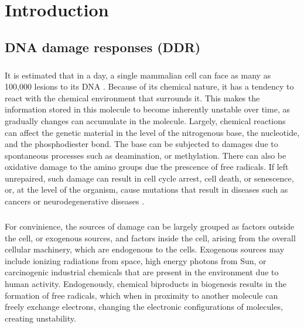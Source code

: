 \chapter{Introduction}
\section{DNA damage responses (DDR)}
\paragraph*{} It is estimated that in a day, a single mammalian cell can face as many as 100,000 lesions to its DNA \cite{ciccia2010dna}. Because of its chemical nature, it has a tendency to react with the chemical environment that surrounds it. This makes the information stored in this molecule to become inherently unstable over time, as gradually changes can accumulate in the molecule. Largely, chemical reactions can affect the genetic material in the level of the nitrogenous base, the nucleotide, and the phosphodiester bond. The base can be subjected to damages due to spontaneous processes such as deamination, or methylation. There can also be oxidative damage to the amino groups due the prescence of free radicals. If left unrepaired, such damage can result in cell cycle arrest, cell death, or senescence, or, at the level of the organism, cause mutations that result in diseases such as cancers or neurodegenerative diseases \cite{friedberg2005dna, madabhushi2014dna}.

\paragraph*{} For convinience, the sources of damage can be largely grouped as factors outside the cell, or exogenous sources, and factors inside the cell, arising from the overall cellular machinery, which are endogenous to the cells. Exogenous sources may include ionizing radiations from space, high energy photons from Sun, or carcinogenic industrial chemicals that are present in the environment due to human activity. Endogenously, chemical biproducts in biogenesis results in the formation of free radicals, which when in proximity to another molecule can freely exchange electrons, changing the electronic configurations of molecules, creating unstability.

